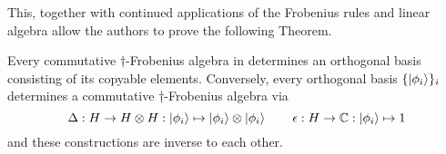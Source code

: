 This, together with continued applications of the Frobenius rules and linear algebra allow the
authors to prove the following Theorem.
\begin{theorem}
  Every commutative $\dagger$-Frobenius algebra in \fdh determines an orthogonal basis consisting
  of its copyable elements. Conversely, every orthogonal basis $\{\left\vert{\phi_{i}}\right\rangle\}_{i}$ determines
  a commutative $\dagger$-Frobenius algebra via \[\Delta:H\to H\otimes H: \left\vert{\phi_{i}}\right\rangle\mapsto
  \left\vert{\phi_{i}}\right\rangle \otimes \left\vert{\phi_{i}}\right\rangle\qquad\epsilon : H\to \mathbb{C} : \left\vert{\phi_{i}}\right\rangle \mapsto 1\] and these
  constructions are inverse to each other.
\end{theorem}






